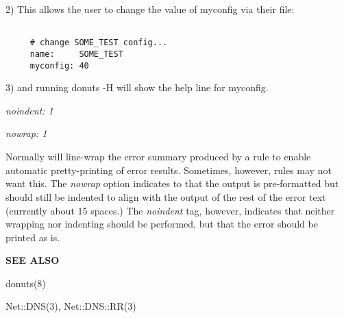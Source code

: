 \begin{description}
2) This allows the user to change the value of myconfig via their
 file:

\begin{verbatim}

     # change SOME_TEST config...
     name:     SOME_TEST
     myconfig: 40
\end{verbatim}

3) and running donuts -H will show the help line for myconfig.

\item {\it noindent: 1}\verb" "

\item {\it nowrap: 1}\verb" "

Normally  will line-wrap the error summary produced by a rule
to enable automatic pretty-printing of error results.  Sometimes,
however, rules may not want this.  The {\it nowrap} option indicates to
 that the output is pre-formatted but should still be indented
to align with the output of the rest of the error text (currently about
15 spaces.)  The {\it noindent} tag, however, indicates that neither
wrapping nor indenting should be performed, but that the error should
be printed as is.

\end{description}

{\bf SEE ALSO}

donuts(8)

Net::DNS(3), Net::DNS::RR(3)


